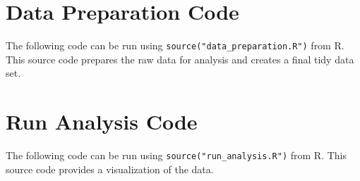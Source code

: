 \documentclass[oneside]{article}
\begin{document}

\newpage

\section{Data Preparation Code}
The following code can be run using \verb|source("data_preparation.R")| from R. This source code prepares the raw data for analysis and creates a final tidy data set.


\newpage

\section{Run Analysis Code}
The following code can be run using \verb|source("run_analysis.R")| from R. This source code provides a visualization of the data.


\end{document}
